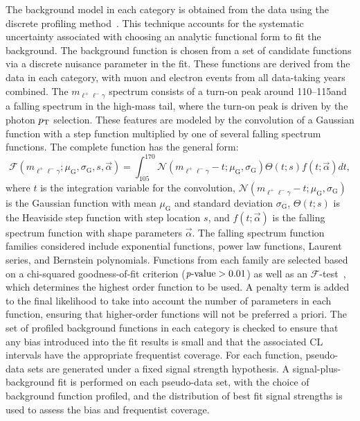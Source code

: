The background model in each category is obtained from the data using the discrete profiling method~\cite{Dauncey:2014xga}.
This technique accounts for the systematic uncertainty associated with choosing an analytic functional form to fit the background.
The background function is chosen from a set of candidate functions via a discrete nuisance parameter in the fit.
These functions are derived from the data in each category, with muon and electron events from all data-taking years combined.
The $m_{\ell^+\ell^-\gamma}$ spectrum consists of a turn-on peak around 110--115\GeV and a falling spectrum in the high-mass tail, where the turn-on peak is driven by the photon $p_{\mathrm{T}}$ selection.
These features are modeled by the convolution of a Gaussian function with a step function multiplied by one of several falling spectrum functions.
The complete function has the general form:
\begin{equation}
    \mathcal{F}(m_{\ell^+\ell^-\gamma}; \mu_{\mathrm{G}}, \sigma_{\mathrm{G}}, s, \vec{\alpha}) = \int_{105}^{170}\mathcal{N}(m_{\ell^+\ell^-\gamma}-t;\mu_{\mathrm{G}},\sigma_{\mathrm{G}})\Theta(t; s)f(t; \vec{\alpha})dt,
\end{equation}
where $t$ is the integration variable for the convolution, $\mathcal{N}(m_{\ell^+\ell^-\gamma}-t;\mu_{\mathrm{G}},\sigma_{\mathrm{G}})$ is the Gaussian function with mean $\mu_{\mathrm{G}}$ and standard deviation $\sigma_{\mathrm{G}}$, $\Theta(t; s)$ is the Heaviside step function with step location $s$, and $f(t; \vec{\alpha})$ is the falling spectrum function with shape parameters $\vec{\alpha}$.
The falling spectrum function families considered include exponential functions, power law functions, Laurent series, and Bernstein polynomials.
Functions from each family are selected based on a chi-squared goodness-of-fit criterion ($\text{\textit{p}-value} > 0.01$) as well as an $\mathcal{F}$-test~\cite{Fisher:1922saa}, which determines the highest order function to be used.
A penalty term is added to the final likelihood to take into account the number of parameters in each function, ensuring that higher-order functions will not be preferred a priori.
The set of profiled background functions in each category is checked to ensure that any bias introduced into the fit results is small and that the associated CL intervals have the appropriate frequentist coverage. For each function, pseudo-data sets are generated under a fixed signal strength hypothesis. A signal-plus-background fit is performed on each pseudo-data set, with the choice of background function profiled, and the distribution of best fit signal strengths is used to assess the bias and frequentist coverage.

